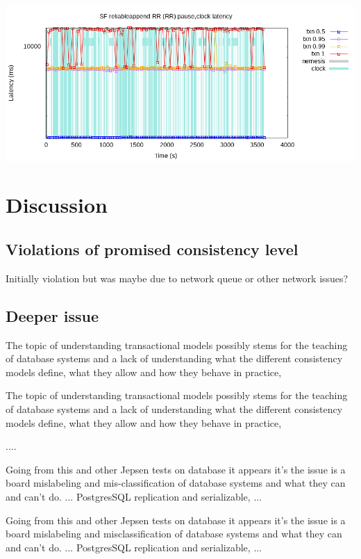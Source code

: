 \documentclass[a4paper,10pt,titlepage]{report}
\begin{document}
    \\
    \includegraphics[scale=0.5]{Report/results/store-2021-11-02-checkme-3/SF reliableappend RR (RR) pause,clock/20211102T014633.000Z/latency-quantiles.png}

    \section{Discussion}
    \subsection{Violations of promised consistency level}

    Initially violation but was maybe due to network queue or other network issues?


    \subsection{Deeper issue}
    The topic of understanding transactional models possibly stems for the teaching of database systems and a lack of understanding what the different consistency models define, what they allow and how they behave in practice,

    The topic of understanding transactional models possibly stems for the teaching of database systems and a lack of understanding what the different consistency models define, what they allow and how they behave in practice,

    ....

    Going from this and other Jepsen tests on database it appears it's the issue is a board mislabeling and mis-classification of database systems and what they can and can't do.
    ...
    PostgresSQL replication and serializable,
    ...

    Going from this and other Jepsen tests on database it appears it's the issue is a board mislabeling and misclassification of database systems and what they can and can't do.
    ...
    PostgresSQL replication and serializable,
    ...
\end{document}
